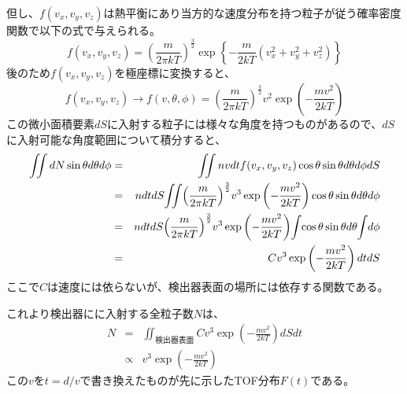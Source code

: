 但し、$f(v_x,v_y,v_z)$は熱平衡にあり当方的な速度分布を持つ粒子が従う確率密度関数で以下の式で与えられる。
\begin{equation}
f(v_x,v_y,v_z)={\left(\frac{m}{2\pi kT}\right)}^{\frac{3}{2}}\exp\left\{-\frac{m}{2kT}(v^2_x+v^2_y+v^2_z)\right\} 
\end{equation}
後のため$f(v_x,v_y,v_z)$を極座標に変換すると、
\begin{equation}
f(v_x,v_y,v_z) \rightarrow f(v,\theta,\phi)={\left(\frac{m}{2\pi kT}\right)}^{\frac{3}{2}}v^2\exp\left(-\frac{mv^2}{2kT}\right)
\end{equation}
この微小面積要素$dS$に入射する粒子には様々な角度を持つものがあるので、$dS$に入射可能な角度範囲について積分すると、
\begin{eqnarray*}
 \iint dN\sin\theta d\theta d\phi &=&\iint nvdtf(v_x,v_y,v_z)\cos\theta \sin\theta d\theta d\phi dS \\ 
&=&ndtdS \hspace{-2pt}\iint \hspace{-2pt}{\left(\frac{m}{2\pi kT}\right)}^{\frac{3}{2}}v^3\exp\left(-\frac{mv^2}{2kT}\right)\cos\theta \sin\theta d\theta d\phi  \\
&=&ndtdS{\left(\frac{m}{2\pi kT}\right)}^{\frac{3}{2}} v^3\exp\left(-\frac{mv^2}{2kT}\right) \hspace{-2pt}\int \hspace{-2pt}\cos\theta\sin\theta d\theta \hspace{-2pt}\int \hspace{-2pt} d\phi \\
&=&Cv^3\exp\left(-\frac{mv^2}{2kT}\right)dtdS
\end{eqnarray*}
ここで$C$は速度には依らないが、検出器表面の場所には依存する関数である。

これより検出器にに入射する全粒子数$N$は、
\begin{eqnarray*}
N &=&
\iint_{検出器表面}Cv^3\exp\left(-\frac{mv^2}{2kT}\right)dSdt \\
&\propto& v^3\exp\left(-\frac{mv^2}{2kT}\right)
\end{eqnarray*}
この$v$を$t=d/v$で書き換えたものが先に示したTOF分布$F(t)$である。
\newpage
